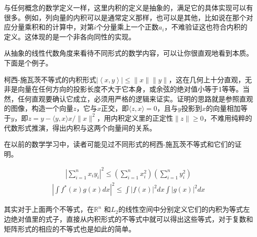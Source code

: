 与任何概念的数学定义一样，这里内积的定义是抽象的，满足它的具体实现可以有很多。例如，列向量的内积可以是通常定义那样，也可以是其他，比如说在那个对应分量乘积和的计算中，对第$ i $个分量乘上一个正数$ a_i $，不难验证这也符合内积的定义。这体现的是一个非各向同性的实现。

从抽象的线性代数角度来看待不同形式的数学内容，可以让你很直观地看到本质。下面是个例子。

\kaishu

柯西-施瓦茨不等式的内积形式$ |\left \langle x,y \right \rangle |\le \|x\|\|y\| $，这在几何上十分直观，无非是向量在任何方向的投影长度不大于它本身，或余弦的绝对值小等于1等等。当然，任何直观要确认它成立，必须用严格的逻辑来证实。证明的思路就是参照直观的图像，构造一个向量$ z $，它与$ x $正交，即$ \langle z, x\rangle = 0 $，且与$ y $投影到$ x $的向量相加等于$ y $，即$ z=y - \langle y, x \rangle x/\|x\|^2 $，用内积定义里的正定性$ \|z\| \ge 0 $，不难用纯粹的代数形式推演，得出内积与这两个向量间的关系。

在以前的数学学习中，读者可能见过不同形式的柯西-施瓦茨不等式和它们的证明。

\begin{gather*}
	|\sum_{i=1}^n x_iy_i|^2 \le (\sum_{i=1}^n x_i^2)(\sum_{i=1}^n y_i^2)
\end{gather*}
\begin{gather*}
	|\int f^*(x)g(x)dx|^2 \le \int |f(x)|^2 dx  \int |g(x)|^2 dx
\end{gather*}

其实对于上面两个不等式，在$ \mathbb{R}^n $
和$ L_2 $的线性空间中分别定义它们的内积为等式左边绝对值里的式子，直接从内积形式的不等式中就可以得出这些等式，对于复数和矩阵形式的相应的不等式也是如此的简单。

\songti
